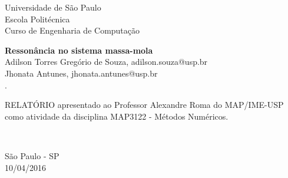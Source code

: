 %





\vspace*{-2cm}
{\bf
\begin{center}
{\large
\hspace*{0cm}Universidade de São Paulo} \\
\hspace*{0cm}Escola Politécnica \\
\hspace*{0cm}Curso de Engenharia de Computação  \\
\end{center}}
\vspace{4.0cm}
\noindent
\begin{center}
{\Large \bf Ressonância no sistema massa-mola} \\[3cm]
{\Large Adilson Torres Gregório de Souza, adilson.souza@usp.br}\\[6mm]
{\Large Jhonata Antunes, jhonata.antunes@usp.br}\\[6mm]
{\Large .%
}\\[3.0cm]
\end{center}

{\raggedleft
\begin{minipage}[t]{8.0cm}
\setlength{\baselineskip}{0.25in}
RELATÓRIO apresentado ao Professor Alexandre Roma do MAP/IME-USP 
como atividade da disciplina MAP3122 - Métodos Numéricos.
\end{minipage}\\[2cm]}
\vspace{2cm}
{\center São Paulo - SP \\[3mm]
10/04/2016 \\}


\newpage